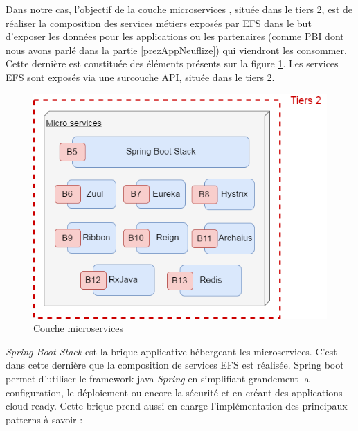 		Dans notre cas, l'objectif de la couche microservices , située dans le tiers 2, est de réaliser la composition des services métiers exposés par EFS dans le but d'exposer les données pour les applications ou les partenaires (comme PBI dont nous avons parlé dans la partie \ref{prezAppNeuflize}) qui viendront les consommer. Cette dernière est constituée des éléments présents sur la figure \ref{coucheMicroservices}. Les services EFS sont exposés via une surcouche API, située dans le tiers 2. \\

\begin{figure}[h!]
\raggedleft
	\includegraphics[scale=0.5]{images/travailNeuflizeOBC/architecture/coucheMicroservices.png}
	\centering
	\caption{Couche microservices}
	\label{coucheMicroservices}
\end{figure}
	
	\textit{Spring Boot Stack} est la brique applicative hébergeant les microservices. C’est dans cette dernière que la composition de services EFS est réalisée. Spring boot permet d'utiliser le framework java \textit{Spring} en simplifiant grandement la configuration, le déploiement ou encore la sécurité et en créant des applications cloud-ready.
	Cette brique prend aussi en charge l’implémentation des principaux patterns à savoir : \\
	
